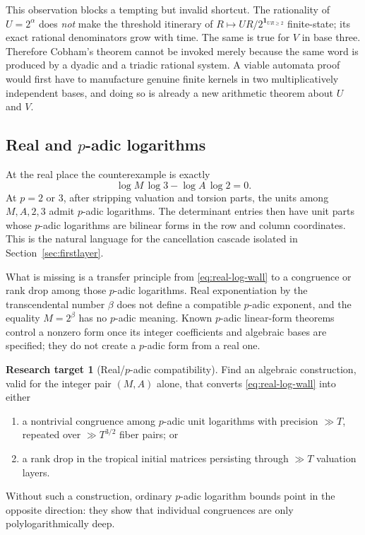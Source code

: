 \documentclass[11pt,oneside]{article}
\theoremstyle{definition}
\newtheorem{target}[theorem]{Research target}
\theoremstyle{remark}
\begin{document}
This observation blocks a tempting but invalid shortcut.  The rationality of
$U=2^\alpha$ does \emph{not} make the threshold itinerary of
$R\mapsto UR/2^{\mathbf1_{UR\ge2}}$ finite-state; its exact rational denominators grow with
time.  The same is true for $V$ in base three.  Therefore Cobham's theorem cannot be invoked
merely because the same word is produced by a dyadic and a triadic rational system.  A viable
automata proof would first have to manufacture genuine finite kernels in two multiplicatively
independent bases, and doing so is already a new arithmetic theorem about $U$ and $V$.

\subsection{Real and \texorpdfstring{$p$}{p}-adic logarithms}

At the real place the counterexample is exactly
\begin{equation}\label{eq:real-log-wall}
 \log M\,\log3-\log A\,\log2=0.
\end{equation}
At $p=2$ or $3$, after stripping valuation and torsion parts, the units among
$M,A,2,3$ admit $p$-adic logarithms.  The determinant entries then have unit parts whose
$p$-adic logarithms are bilinear forms in the row and column coordinates.  This is the natural
language for the cancellation cascade isolated in Section~\ref{sec:firstlayer}.

What is missing is a transfer principle from \eqref{eq:real-log-wall} to a congruence or rank
drop among those $p$-adic logarithms.  Real exponentiation by the transcendental number
$\beta$ does not define a compatible $p$-adic exponent, and the equality $M=2^\beta$ has no
$p$-adic meaning.  Known $p$-adic linear-form theorems control a nonzero form once its integer
coefficients and algebraic bases are specified; they do not create a $p$-adic form from a real
one.

\begin{target}[Real/$p$-adic compatibility]\label{target:real-padic}
Find an algebraic construction, valid for the integer pair $(M,A)$ alone, that converts
\eqref{eq:real-log-wall} into either
\begin{enumerate}
\item a nontrivial congruence among $p$-adic unit logarithms with precision $\gg T$, repeated
      over $\gg T^{3/2}$ fiber pairs; or
\item a rank drop in the tropical initial matrices persisting through $\gg T$ valuation
      layers.
\end{enumerate}
Without such a construction, ordinary $p$-adic logarithm bounds point in the opposite
direction: they show that individual congruences are only polylogarithmically deep.
\end{target}
\end{document}
